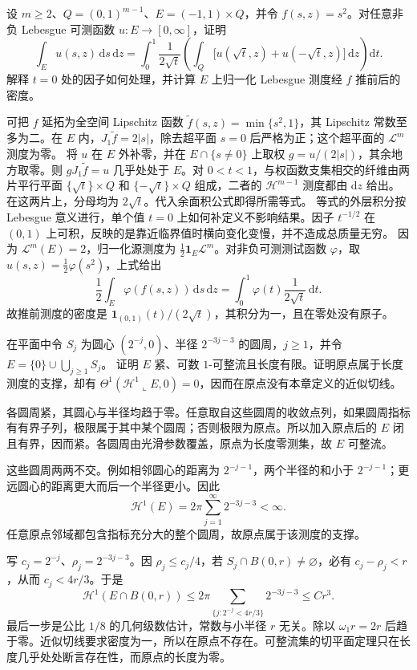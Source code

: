 \begin{exercise}\label{g3:ex:coarea-square-pushforward}
	设 \(m\ge2\)、\(Q=(0,1)^{m-1}\)、\(E=(-1,1)\times Q\)，并令 \(f(s,z)=s^2\)。对任意非负 Lebesgue 可测函数 \(u:E\to[0,\infty]\)，证明
	\[
		\int_Eu(s,z)\,\mathrm ds\,\mathrm dz
		=\int_0^1\frac1{2\sqrt t}
		\left(\int_Q\bigl[u(\sqrt t,z)+u(-\sqrt t,z)\bigr]\,\mathrm dz\right)\mathrm dt.
	\]
	解释 \(t=0\) 处的因子如何处理，并计算 \(E\) 上归一化 Lebesgue 测度经 \(f\) 推前后的密度。
\end{exercise}
\begin{solution}
	可把 \(f\) 延拓为全空间 Lipschitz 函数 \(\widetilde f(s,z)=\min\{s^2,1\}\)，其 Lipschitz 常数至多为二。在 \(E\) 内，\(J_1\widetilde f=2|s|\)，除去超平面 \(s=0\) 后严格为正；这个超平面的 \(\mathcal L^m\) 测度为零。
	将 \(u\) 在 \(E\) 外补零，并在 \(E\cap\{s\ne0\}\) 上取权 \(g=u/(2|s|)\)，其余地方取零。则 \(gJ_1\widetilde f=u\) 几乎处处于 \(E\)。对 \(0<t<1\)，与权函数支集相交的纤维由两片平行平面 \(\{\sqrt t\}\times Q\) 和 \(\{-\sqrt t\}\times Q\) 组成，二者的 \(\mathcal H^{m-1}\) 测度都由 \(\mathrm dz\) 给出。在这两片上，分母均为 \(2\sqrt t\)。代入余面积公式即得所需等式。
	等式的外层积分按 Lebesgue 意义进行，单个值 \(t=0\) 上如何补定义不影响结果。因子 \(t^{-1/2}\) 在 \((0,1)\) 上可积，反映的是靠近临界值时横向变化变慢，并不造成总质量无穷。
	因为 \(\mathcal L^m(E)=2\)，归一化源测度为 \(\tfrac12\mathbf1_E\mathcal L^m\)。对非负可测测试函数 \(\varphi\)，取 \(u(s,z)=\tfrac12\varphi(s^2)\)，上式给出
	\[
		\frac12\int_E\varphi(f(s,z))\,\mathrm ds\,\mathrm dz
		=\int_0^1\varphi(t)\frac1{2\sqrt t}\,\mathrm dt.
	\]
	故推前测度的密度是 \(\mathbf1_{(0,1)}(t)/(2\sqrt t)\)，其积分为一，且在零处没有原子。
\end{solution}

\begin{exercise}\label{g3:ex:circles-zero-density-point}
	在平面中令 \(S_j\) 为圆心 \((2^{-j},0)\)、半径 \(2^{-3j-3}\) 的圆周，\(j\ge1\)，并令
	\(E=\{0\}\cup\bigcup_{j\ge1}S_j\)。
	证明 \(E\) 紧、可数 \(1\)-可整流且长度有限。证明原点属于长度测度的支撑，却有 \(\Theta^1(\mathcal H^1\llcorner E,0)=0\)，因而在原点没有本章定义的近似切线。
\end{exercise}
\begin{solution}
	各圆周紧，其圆心与半径均趋于零。任意取自这些圆周的收敛点列，如果圆周指标有有界子列，极限属于其中某个圆周；否则极限为原点。所以加入原点后的 \(E\) 闭且有界，因而紧。各圆周由光滑参数覆盖，原点为长度零测集，故 \(E\) 可整流。

	这些圆周两两不交。例如相邻圆心的距离为 \(2^{-j-1}\)，两个半径的和小于 \(2^{-j-1}\)；更远圆心的距离更大而后一个半径更小。因此
	\[
		\mathcal H^1(E)=2\pi\sum_{j=1}^{\infty}2^{-3j-3}<\infty.
	\]
	任意原点邻域都包含指标充分大的整个圆周，故原点属于该测度的支撑。

	写 \(c_j=2^{-j}\)、\(\rho_j=2^{-3j-3}\)。因 \(\rho_j\le c_j/4\)，若 \(S_j\cap B(0,r)\ne\varnothing\)，必有 \(c_j-\rho_j<r\)，从而 \(c_j<4r/3\)。于是
	\[
		\mathcal H^1(E\cap B(0,r))
		\le2\pi\sum_{\{j:2^{-j}<4r/3\}}2^{-3j-3}
		\le Cr^3.
	\]
	最后一步是公比 \(1/8\) 的几何级数估计，常数与小半径 \(r\) 无关。除以 \(\omega_1r=2r\) 后趋于零。近似切线要求密度为一，所以在原点不存在。可整流集的切平面定理只在长度几乎处处断言存在性，而原点的长度为零。
\end{solution}

